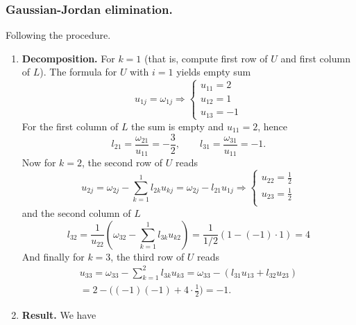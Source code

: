\documentclass[../../../main.tex]{subfiles}
\begin{document}
\subsubsection{Gaussian-Jordan elimination.} 
Following the procedure.
\begin{enumerate}
    \item \textbf{Decomposition.}
          For $k=1$ (that is, compute first row of $U$ and first column of $L$). The formula for $U$  with $i=1$ yields empty sum
          \begin{equation*}
              u_{1j} = \omega_{1j}\Rightarrow
              \begin{cases}
                  u_{11}=2 \\u_{12}=1\\u_{13}=-1
              \end{cases}
          \end{equation*}
          For the first column of $L$ the sum is empty and $u_{11}=2$, hence
          \begin{equation*}
              l_{21} = \frac{\omega_{21}}{u_{11}} = -\frac{3}{2}, \qquad
              l_{31} = \frac{\omega_{31}}{u_{11}} = -1.
          \end{equation*}
          Now for $k=2$, the second row of $U$ reads
          \begin{equation*}
              u_{2j}=\omega_{2j}-\sum_{k=1 }^{1}l_{2k}u_{kj}=\omega_{2j}-l_{21}u_{1j}\Rightarrow
              \begin{cases}
                  u_{22} = \frac{1}{2}  \\
                  u_{23}  = \frac{1}{2} \\
              \end{cases}
          \end{equation*}
          and the second column of $L$
          \begin{equation*}
              l_{32} = \frac{1}{u_{22}} \left( \omega_{32} -\sum_{k=1 }^{1} l_{3k}u_{k2} \right)=\frac{1}{1/2}\left(1 - (-1)\cdot 1\right) = 4
          \end{equation*}
          And finally for $k=3$, the third row of $U$ reads
          \begin{multline*}
              u_{33} =\omega_{33}-\sum_{k=1 }^{2}l_{3k}u_{k3}= \omega_{33} - (l_{31}u_{13} + l_{32}u_{23})\\
               = 2 - \big( (-1)(-1) + 4\cdot \frac{1}{2} \big) = -1.
          \end{multline*}
    \item \textbf{Result.} We have

\end{enumerate}
\end{document}
